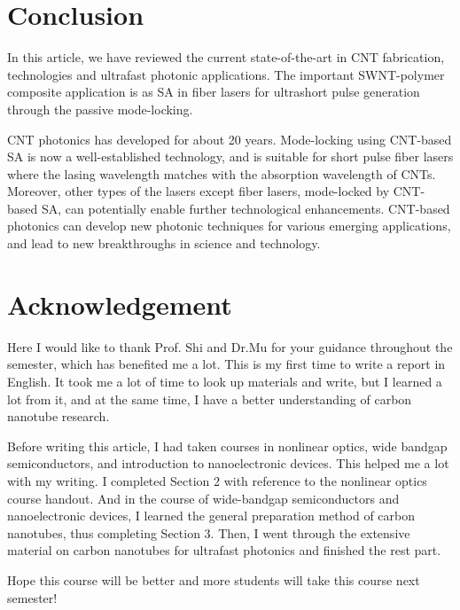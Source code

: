 \documentclass{phyasgn}\usepackage{nag}
\begin{document}
\section{Conclusion}
In this article, we have reviewed the current state-of-the-art in CNT fabrication, technologies and ultrafast photonic applications. The important SWNT-polymer composite application is as SA in fiber lasers for ultrashort pulse generation through the passive mode-locking. 
\par CNT photonics has developed for about 20 years. Mode-locking using CNT-based SA is now a well-established technology, and is suitable for short pulse fiber lasers where the lasing wavelength matches with the absorption wavelength of CNTs. Moreover, other types of the lasers except fiber lasers, mode-locked by CNT-based SA, can potentially enable further technological enhancements. CNT-based photonics can develop new photonic techniques for various emerging applications, and lead to new breakthroughs in science and technology.
\appendix
\section{Acknowledgement}
Here I would like to thank Prof. Shi and Dr.Mu for your guidance throughout the semester, which has benefited me a lot. This is my first time to write a report in English. It took me a lot of time to look up materials and write, but I learned a lot from it, and at the same time, I have a better understanding of carbon nanotube research.
\par Before writing this article, I had taken courses in nonlinear optics, wide bandgap semiconductors, and introduction to nanoelectronic devices. This helped me a lot with my writing. I completed Section 2 with reference to the nonlinear optics course handout. And in the course of wide-bandgap semiconductors and nanoelectronic devices, I learned the general preparation method of carbon nanotubes, thus completing Section 3. Then, I went through the extensive material on carbon nanotubes for ultrafast photonics and finished the rest part. 
\par Hope this course will be better and more students will take this course next semester!
\printbibliography[heading=bibintoc]
\end{document}
